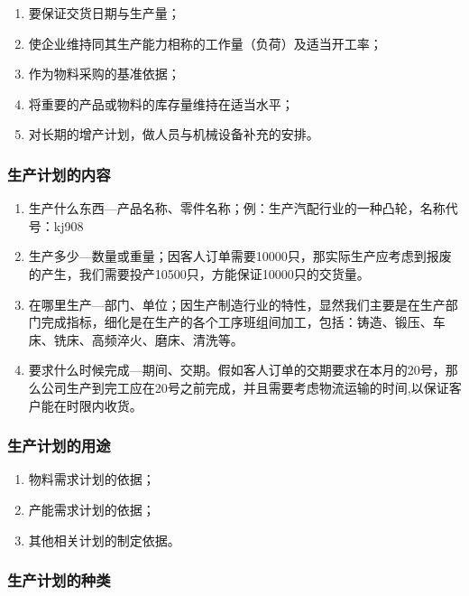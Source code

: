         \begin{enumerate}
            \item  要保证交货日期与生产量；
            \item  使企业维持同其生产能力相称的工作量（负荷）及适当开工率；
            \item  作为物料采购的基准依据；
            \item  将重要的产品或物料的库存量维持在适当水平；
            \item  对长期的增产计划，做人员与机械设备补充的安排。
        \end{enumerate}

    \subsubsection {生产计划的内容}

        \begin{enumerate}
            \item  生产什么东西—产品名称、零件名称；例：生产汽配行业的一种凸轮，名称代号：kj908
            \item  生产多少—数量或重量；因客人订单需要10000只，那实际生产应考虑到报废的产生，我们需要投产10500只，方能保证10000只的交货量。
            \item  在哪里生产—部门、单位；因生产制造行业的特性，显然我们主要是在生产部门完成指标，细化是在生产的各个工序班组间加工，包括：铸造、锻压、车床、铣床、高频淬火、磨床、清洗等。
            \item  要求什么时候完成—期间、交期。假如客人订单的交期要求在本月的20号，那么公司生产到完工应在20号之前完成，并且需要考虑物流运输的时间,以保证客户能在时限内收货。
        \end{enumerate}

    \subsubsection {生产计划的用途}

        \begin{enumerate}
            \item  物料需求计划的依据；
            \item  产能需求计划的依据；
            \item  其他相关计划的制定依据。
        \end{enumerate}

    \subsubsection {生产计划的种类}

